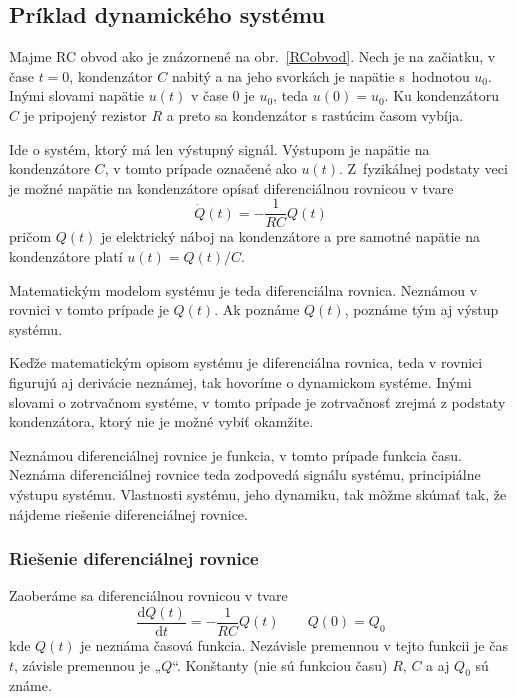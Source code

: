 \documentclass[a4paper, 10pt, ]{article}
\begin{document}
\subsection{Príklad dynamického systému}

Majme RC obvod ako je znázornené na obr.~\ref{RCobvod}. Nech je na začiatku, v čase $t=0$, kondenzátor $C$ nabitý a na jeho svorkách je napätie s~hodnotou $u_0$. Inými slovami napätie $u(t)$ v čase $0$ je $u_0$, teda $u(0) = u_0$. Ku kondenzátoru $C$ je pripojený rezistor $R$ a preto sa kondenzátor s rastúcim časom vybíja.

\begin{center}

	\makebox[\textwidth][c]{%
	
	}

	\label{RCobvod}
\end{center}

Ide o systém, ktorý má len výstupný signál. Výstupom je napätie na kondenzátore $C$, v tomto prípade označené ako $u(t)$. Z~fyzikálnej podstaty veci je možné napätie na kondenzátore opísať diferenciálnou rovnicou v tvare
\begin{equation} \label{diffR}
    \dot Q(t) = - \frac{1}{RC} Q(t)
\end{equation}
pričom $Q(t)$ je elektrický náboj na kondenzátore a pre samotné napätie na kondenzátore platí $u(t) = Q(t) / C$.

Matematickým modelom systému je teda diferenciálna rovnica. Neznámou v rovnici v tomto prípade je $Q(t)$. Ak poznáme $Q(t)$, poznáme tým aj výstup systému.

Keďže matematickým opisom systému je diferenciálna rovnica, teda v rovnici figurujú aj derivácie neznámej, tak hovoríme o dynamickom systéme. Inými slovami o zotrvačnom systéme, v tomto prípade je zotrvačnosť zrejmá z podstaty kondenzátora, ktorý nie je možné vybiť okamžite.

Neznámou diferenciálnej rovnice je funkcia, v tomto prípade funkcia času. Neznáma diferenciálnej rovnice teda zodpovedá signálu systému, principiálne výstupu systému. Vlastnosti systému, jeho dynamiku, tak môžme skúmať tak, že nájdeme riešenie diferenciálnej rovnice.


\subsubsection{Riešenie diferenciálnej rovnice}

Zaoberáme sa diferenciálnou rovnicou v tvare
\begin{equation} \label{diffRbeta}
    \frac{\text{d}Q(t)}{\text{d}t} = - \frac{1}{RC} Q(t) \qquad Q(0) = Q_0
\end{equation}
kde $Q(t)$ je neznáma časová funkcia. Nezávisle premennou v tejto funkcii je čas $t$, závisle premennou je „$Q$“.  Konštanty (nie sú funkciou času) $R$, $C$ a aj $Q_0$ sú známe. 
\end{document}
